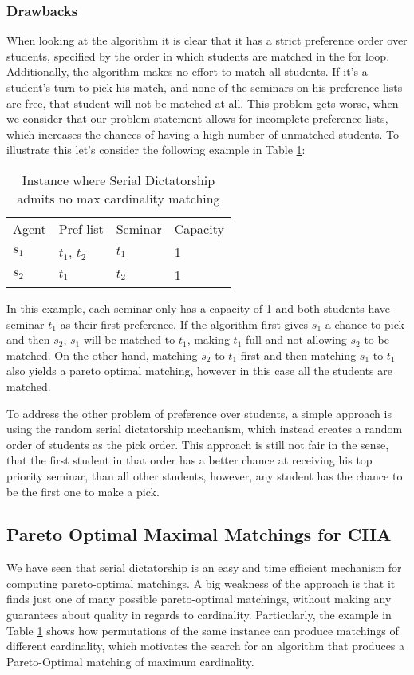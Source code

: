 \subsubsection{Drawbacks}
When looking at the algorithm it is clear that it has a strict preference order over students, specified by the order in which students are matched in the for loop. Additionally, the algorithm makes no effort to match all students. If it's a student's turn to pick his match, and none of the seminars on his preference lists are free, that student will not be matched at all. This problem gets worse, when we consider that our problem statement allows for incomplete preference lists, which increases the chances of having a high number of unmatched students. To illustrate this let's consider the following example in Table \ref{table:1}:
\begin{table}[h!]
    \centering 
    \begin{tabular}{llll}
    Agent   & Pref list     & Seminar   & Capacity \\
    $s_1$   & $t_1$, $t_2$  & $t_1$     & 1        \\
    $s_2$   & $t_1$         & $t_2$     & 1       
    \end{tabular}
    \caption{Instance where Serial Dictatorship admits no max cardinality matching}
    \label{table:1}
\end{table} 
In this example, each seminar only has a capacity of 1 and both students have seminar $t_1$ as their first preference. If the algorithm first gives $s_1$ a chance to pick and then $s_2$, $s_1$ will be matched to $t_1$, making $t_1$ full and not allowing $s_2$ to be matched. On the other hand, matching $s_2$ to $t_1$ first and then matching $s_1$ to $t_1$ also yields a pareto optimal matching, however in this case all the students are matched.

To address the other problem of preference over students, a simple approach is using the random serial dictatorship mechanism, which instead creates a random order of students as the pick order. This approach is still not fair in the sense, that the first student in that order has a better chance at receiving his top priority seminar, than all other students, however, any student has the chance to be the first one to make a pick. 

\subsection{Pareto Optimal Maximal Matchings for CHA}
We have seen that serial dictatorship is an easy and time efficient mechanism for computing pareto-optimal matchings. A big weakness of the approach is that it finds just one of many possible pareto-optimal matchings, without making any guarantees about quality in regards to cardinality. Particularly, the example in Table \ref{table:1} shows how permutations of the same instance can produce matchings of different cardinality, which motivates the search for an algorithm that produces a Pareto-Optimal matching of maximum cardinality. 

